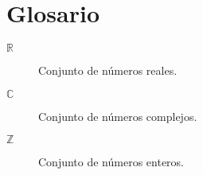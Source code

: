 
\chapter*{Glosario}

\begin{description} 
  \item[$\mathbb{R}$] Conjunto de números reales.

  \item[$\mathbb{C}$] Conjunto de números complejos.

  \item[$\mathbb{Z}$] Conjunto de números enteros.
\end{description}
\endinput
